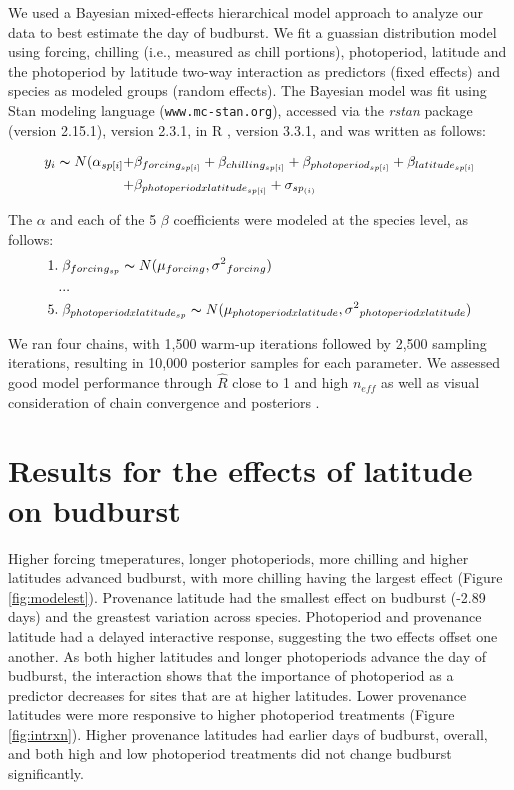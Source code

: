 \documentclass{article}\usepackage[]{graphicx}\usepackage[]{color}
\begin{document}
We used a Bayesian mixed-effects hierarchical model approach to analyze our data to best estimate the day of budburst. We fit a guassian distribution model using forcing, chilling (i.e., measured as chill portions), photoperiod, latitude and the photoperiod by latitude two-way interaction as predictors (fixed effects) and species as modeled groups (random effects). The Bayesian model was fit using Stan modeling language \citep{Carpenter2017}(\texttt{www.mc-stan.org}), accessed via the \textit{rstan} package (version 2.15.1), version 2.3.1, in R \citep{R}, version 3.3.1, and was written as follows: 

\begin{align*}
y_i \thicksim N(\alpha_{sp[i]} +& \beta_{forcing_{sp[i]}} + \beta_{chilling_{sp[i]}} + \beta_{photoperiod_{sp[i]}} + \beta_{latitude_{sp[i]}}  \\
	+& \beta_{photoperiod x latitude_{sp[i]}} + \sigma_{sp_{(i)}}
\end{align*}

\noindent The $\alpha$ and each of the 5 $\beta$ coefficients were modeled at the species level, as follows:
\begin{align*}
1.& \; \beta_{forcing_{sp}} \thicksim N(\mu_{forcing}, \sigma{^2}_{forcing}) \\
   &... \\
5.& \; \beta_{photoperiod x latitude_{sp}} \thicksim N(\mu_{photoperiod x latitude}, \sigma{^2}_{photoperiod x latitude})
\end{align*}

We ran four chains, with 1,500 warm-up iterations followed by 2,500 sampling iterations, resulting in 10,000 posterior samples for each parameter. We assessed good model performance through $\hat{R}$ close to 1 and high $n_{eff}$ as well as visual consideration of chain convergence and posteriors \citep{Gelman2006}. 

\section*{Results for the effects of latitude on budburst}
Higher forcing tmeperatures, longer photoperiods, more chilling and higher latitudes advanced budburst, with more chilling having the largest effect (Figure \ref{fig:modelest}). Provenance latitude had the smallest effect on budburst (-2.89 days) and the greastest variation across species. Photoperiod and provenance latitude had a delayed interactive response, suggesting the two effects offset one another. As both higher latitudes and longer photoperiods advance the day of budburst, the interaction shows that the importance of photoperiod as a predictor decreases for sites that are at higher latitudes. Lower provenance latitudes were more responsive to higher photoperiod treatments (Figure \ref{fig:intrxn}). Higher provenance latitudes had earlier days of budburst, overall, and both high and low photoperiod treatments did not change budburst significantly. 
\end{document}
